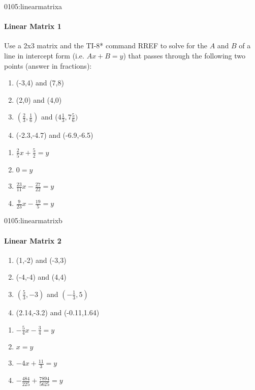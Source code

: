 \begin{defproblem}{0105:linearmatrixa}
\begin{onlyproblem}
\paragraph{Linear Matrix 1}
Use a 2x3 matrix and the TI-8* command RREF to solve for the
$A$ and $B$ of a line in intercept form (i.e. $Ax+B=y$) that passes
through the following two points (answer in fractions):
\begin{enumerate}
\item (-3,4) and (7,8)
\item (2,0) and (4,0)
\item $(\frac{2}{3},\frac{1}{6})$ and ($4\frac{1}{3},7\frac{5}{6})$
\item (-2.3,-4.7) and (-6.9,-6.5)
\end{enumerate}
\end{onlyproblem}
\begin{onlysolution}
\begin{enumerate}
\item $\frac{2}{5}x+\frac{5}{2}=y$
\item $0=y$
\item $\frac{23}{11}x-\frac{27}{22}=y$
\item $\frac{9}{23}x-\frac{19}{5}=y$
\end{enumerate}
\end{onlysolution}
\end{defproblem}


\begin{defproblem}{0105:linearmatrixb}
\begin{onlyproblem}
\paragraph{Linear Matrix 2}
\begin{enumerate}
\item (1,-2) and (-3,3)
\item (-4,-4) and (4,4)
\item $(\frac{5}{3},-3)$ and $(-\frac{1}{3},5)$
\item (2.14,-3.2) and (-0.11,1.64)
\end{enumerate}
\end{onlyproblem}
\begin{onlysolution}
\begin{enumerate}
\item $-\frac{5}{4}x-\frac{3}{4}=y$
\item $x=y$
\item $-4x+\frac{11}{3}=y$
\item $-\frac{484}{225}+\frac{7894}{5625}=y$
\end{enumerate}
\end{onlysolution}
\end{defproblem}




